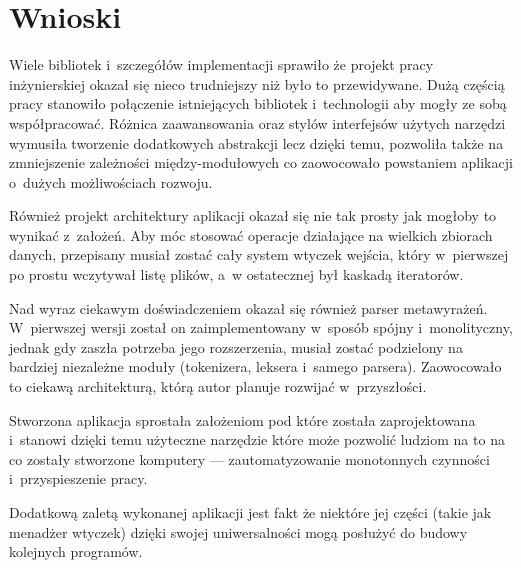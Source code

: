 \chapter{Wnioski}
\label{wnioski}

\par
Wiele bibliotek i~szczegółów implementacji sprawiło że projekt pracy inżynierskiej okazał się nieco trudniejszy niż było to przewidywane.
Dużą częścią pracy stanowiło połączenie istniejących bibliotek i~technologii aby mogły ze sobą współpracować. Różnica zaawansowania oraz stylów interfejsów użytych narzędzi wymusiła tworzenie dodatkowych abstrakcji lecz dzięki temu, pozwoliła także na zmniejszenie zależności między-modułowych co zaowocowało powstaniem aplikacji o~dużych możliwościach rozwoju.

\par
Również projekt architektury aplikacji okazał się nie tak prosty jak mogłoby to wynikać z~założeń. Aby móc stosować operacje działające na wielkich zbiorach danych, przepisany musiał zostać cały system wtyczek wejścia, który w~pierwszej po prostu wczytywał listę plików, a~w ostatecznej był kaskadą iteratorów.

\par
Nad wyraz ciekawym doświadczeniem okazał się również parser metawyrażeń.
 W~pierwszej wersji został on zaimplementowany w~sposób spójny i~monolityczny, jednak gdy zaszła potrzeba jego rozszerzenia, musiał zostać podzielony na bardziej niezależne moduły (tokenizera, leksera i~samego parsera). Zaowocowało to ciekawą architekturą, którą autor planuje rozwijać w~przyszłości.

\par
Stworzona aplikacja sprostała założeniom pod które została zaprojektowana i~stanowi dzięki temu użyteczne narzędzie które może pozwolić ludziom na to na co zostały stworzone komputery --- zautomatyzowanie monotonnych czynności i~przyspieszenie pracy.

\par
Dodatkową zaletą wykonanej aplikacji jest fakt że niektóre jej części (takie jak menadżer wtyczek) dzięki swojej uniwersalności mogą posłużyć do budowy kolejnych programów.
